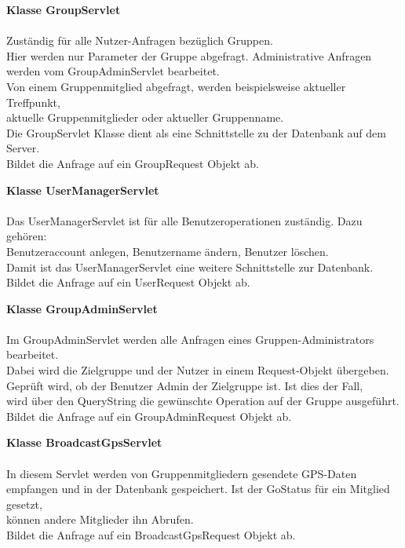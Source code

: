\newpage
\textbf{Klasse GroupServlet} \\
\\
Zuständig für alle Nutzer-Anfragen bezüglich Gruppen. \\
Hier werden nur Parameter der Gruppe abgefragt. Administrative Anfragen werden vom GroupAdminServlet bearbeitet.\\
Von einem Gruppenmitglied abgefragt, werden beispielsweise aktueller Treffpunkt,\\
aktuelle Gruppenmitglieder oder aktueller Gruppenname.\\
Die GroupServlet Klasse dient als eine Schnittstelle zu der Datenbank auf dem Server.\\
Bildet die Anfrage auf ein GroupRequest Objekt ab.

\textbf{Klasse UserManagerServlet} \\
\\
Das UserManagerServlet ist für alle Benutzeroperationen zuständig. Dazu gehören:\\
Benutzeraccount anlegen, Benutzername ändern, Benutzer löschen.\\
Damit ist das UserManagerServlet eine weitere Schnittstelle zur Datenbank.\\
Bildet die Anfrage auf ein UserRequest Objekt ab.

\textbf{Klasse GroupAdminServlet} \\
\\
Im GroupAdminServlet werden alle Anfragen eines Gruppen-Administrators bearbeitet.\\
Dabei wird die Zielgruppe und der Nutzer in einem Request-Objekt übergeben.\\
Geprüft wird, ob der Benutzer Admin der Zielgruppe ist. Ist dies der Fall, \\
wird über den QueryString die gewünschte Operation auf der Gruppe ausgeführt.\\
Bildet die Anfrage auf ein GroupAdminRequest Objekt ab.

\textbf{Klasse BroadcastGpsServlet} \\
\\
In diesem Servlet werden von Gruppenmitgliedern gesendete GPS-Daten empfangen und in der
Datenbank gespeichert. Ist der GoStatus für ein Mitglied gesetzt,\\
können andere Mitglieder ihn Abrufen.\\
Bildet die Anfrage auf ein BroadcastGpsRequest Objekt ab.

\newpage

